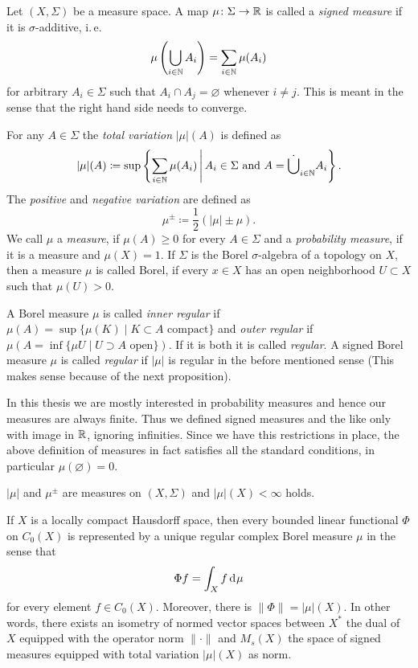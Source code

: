 \begin{defin}
  Let \((X, \Sigma)\) be a measure space. A map \(\mu \colon \Sigma \to \mathbb{R}\) is called a \emph{signed measure} if it is \(\sigma\)-additive, i.\,e.
  \[
    \mu\left(\bigcup_{i \in \mathbb{N}}A_i \right) = \sum_{i \in \mathbb{N}} \mu(A_i)
  \]
  for arbitrary \(A_i \in \Sigma\) such that \(A_i \cap A_j = \varnothing\) whenever \(i \neq j\). This is meant in the sense that the right hand side needs to converge.

  For any \(A \in \Sigma\) the \emph{total variation} \(|\mu|(A)\) is defined as
  \[
    |\mu|(A) \coloneqq \sup \left\{\sum_{i \in \mathbb{N}} \mu(A_i) \,\middle|\, A_i \in \Sigma \text{ and } A = \dot \bigcup_{i \in \mathbb{N}} A_i \right \}.
  \]
  The \emph{positive} and \emph{negative variation} are defined as
  \[
    \mu^\pm \coloneqq \frac12 (|\mu| \pm \mu).
  \]
  We call \(\mu\) a \emph{measure}, if \(\mu(A) \geq 0\) for every \(A \in \Sigma\) and a \emph{probability measure}, if it is a measure and \(\mu(X) = 1\). If \(\Sigma\) is the Borel \(\sigma\)-algebra of a topology on \(X\), then a measure \(\mu\) is called Borel, if every \(x \in X\) has an open neighborhood \(U \subset X\) such that \(\mu(U) > 0\).
  
  A Borel measure \(\mu\) is called \emph{inner regular} if \(\mu(A) = \sup \{ \mu(K) \mid K \subset A \text{ compact}\}\) and \emph{outer regular} if \(\mu(A = \inf \{ \mu{U} \mid U \supset A \text{ open}\})\). If it is both it is called \emph{regular}. A signed Borel measure \(\mu\) is called \emph{regular} if \(|\mu|\) is regular in the before mentioned sense (This makes sense because of the next proposition).
\end{defin}

\begin{rem}
  In this thesis we are mostly interested in probability measures and hence our measures are always finite. Thus we defined signed measures and the like only with image in \(\mathbb{R}\), ignoring infinities. Since we have this restrictions in place, the above definition of measures in fact satisfies all the standard conditions, in particular \(\mu(\varnothing) = 0\).
\end{rem}

\begin{prop}
  \(|\mu|\) and \(\mu^\pm\) are measures on \((X, \Sigma)\) and \(|\mu|(X) < \infty\) holds.
\end{prop}

\begin{thm}
  \label{thm:riesz-markow}
  If \(X\) is a locally compact Hausdorff space, then every bounded linear functional \(\Phi\) on \(C_0(X)\) is represented by a unique regular complex Borel measure \(\mu\) in the sense that \[
    \Phi f = \int_X f \d\mu
  \]
  for every element \(f \in C_0(X)\). Moreover, there is \(\|\Phi\| = |\mu|(X)\). In other words, there exists an isometry of normed vector spaces between \(X^\ast\) the dual of \(X\) equipped with the operator norm \(\|\cdot \|\) and \(M_{s}(X)\) the space of signed measures equipped with total variation \(|\mu|(X)\) as norm.
\end{thm}

